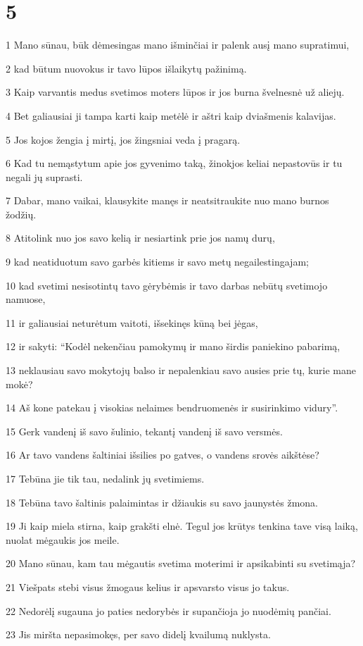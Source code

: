 \chapter{5}


\par 1 Mano sūnau, būk dėmesingas mano išminčiai ir palenk ausį mano supratimui, 
\par 2 kad būtum nuovokus ir tavo lūpos išlaikytų pažinimą. 
\par 3 Kaip varvantis medus svetimos moters lūpos ir jos burna švelnesnė už aliejų. 
\par 4 Bet galiausiai ji tampa karti kaip metėlė ir aštri kaip dviašmenis kalavijas. 
\par 5 Jos kojos žengia į mirtį, jos žingsniai veda į pragarą. 
\par 6 Kad tu nemąstytum apie jos gyvenimo taką, žinok­jos keliai nepastovūs ir tu negali jų suprasti. 
\par 7 Dabar, mano vaikai, klausykite manęs ir neatsitraukite nuo mano burnos žodžių. 
\par 8 Atitolink nuo jos savo kelią ir nesiartink prie jos namų durų, 
\par 9 kad neatiduotum savo garbės kitiems ir savo metų negailestingajam; 
\par 10 kad svetimi nesisotintų tavo gėrybėmis ir tavo darbas nebūtų svetimojo namuose, 
\par 11 ir galiausiai neturėtum vaitoti, išsekinęs kūną bei jėgas, 
\par 12 ir sakyti: “Kodėl nekenčiau pamokymų ir mano širdis paniekino pabarimą, 
\par 13 neklausiau savo mokytojų balso ir nepalenkiau savo ausies prie tų, kurie mane mokė? 
\par 14 Aš kone patekau į visokias nelaimes bendruomenės ir susirinkimo vidury”. 
\par 15 Gerk vandenį iš savo šulinio, tekantį vandenį iš savo versmės. 
\par 16 Ar tavo vandens šaltiniai išsilies po gatves, o vandens srovės aikštėse? 
\par 17 Tebūna jie tik tau, nedalink jų svetimiems. 
\par 18 Tebūna tavo šaltinis palaimintas ir džiaukis su savo jaunystės žmona. 
\par 19 Ji kaip miela stirna, kaip grakšti elnė. Tegul jos krūtys tenkina tave visą laiką, nuolat mėgaukis jos meile. 
\par 20 Mano sūnau, kam tau mėgautis svetima moterimi ir apsikabinti su svetimąja? 
\par 21 Viešpats stebi visus žmogaus kelius ir apsvarsto visus jo takus. 
\par 22 Nedorėlį sugauna jo paties nedorybės ir supančioja jo nuodėmių pančiai. 
\par 23 Jis miršta nepasimokęs, per savo didelį kvailumą nuklysta.



